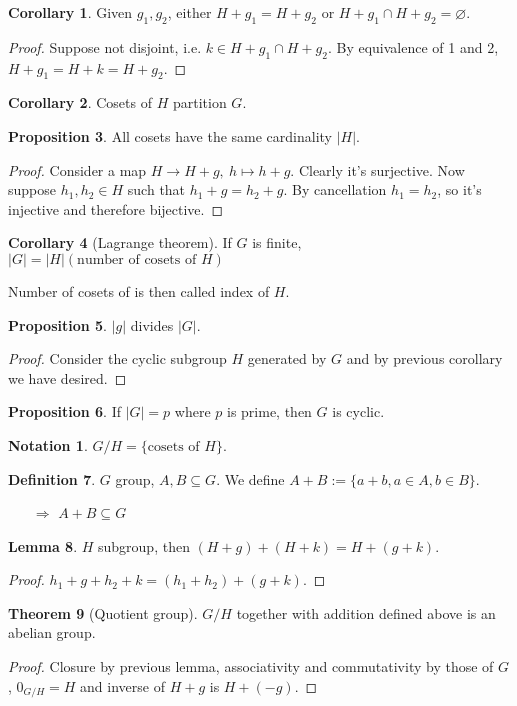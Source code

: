 \documentclass[a4paper]{article}
\theoremstyle{definition}
\newtheorem{defn}{Definition}[subsection]
\newtheorem{prop}[defn]{Proposition}
\newtheorem{thm}[defn]{Theorem}
\newtheorem{lemma}[defn]{Lemma}
\newtheorem{coro}[defn]{Corollary}
\newtheorem*{notation}{Notation}
\begin{document}
\begin{coro}
Given $g_1,g_2$, either $H+g_1=H+g_2$ or $H+g_1\cap H+g_2=\varnothing$.
\end{coro}
\begin{proof}
Suppose not disjoint, i.e. $k\in H+g_1\cap H+g_2$. By equivalence of 1 and 2, $H+g_1=H+k=H+g_2$.
\end{proof}
\begin{coro}
Cosets of $H$ partition $G$.
\end{coro}
\begin{prop}
All cosets have the same cardinality $|H|.$
\end{prop}
\begin{proof}
Consider a map $H\rightarrow H+g,\ h\mapsto h+g$. Clearly it's surjective. Now suppose $h_1,h_2\in H$ such that $h_1+g=h_2+g$. By cancellation $h_1=h_2$, so it's injective and therefore bijective.
\end{proof}
\begin{coro}[Lagrange theorem]
If $G$ is finite, $|G|=|H|(\text{number of cosets of }H)$
\end{coro}
Number of cosets of is then called index of $H.$
\begin{prop}
$|g|$ divides $|G|$.
\end{prop}
\begin{proof}
Consider the cyclic subgroup $H$ generated by $G$ and by previous corollary we have desired.
\end{proof}
\begin{prop}
If $|G|=p$ where $p$ is prime, then $G$ is cyclic.
\end{prop}
\begin{notation}
$G/H=\{\text{cosets of }H\}$.
\end{notation}
\begin{defn}
$G$ group, $A,B \subseteq G$. We define $A+B:=\{a+b,a\in A,b\in B\}$.
\begin{itemize}
    \item[$\Rightarrow$] $A+B \subseteq G$
\end{itemize}
\end{defn}
\begin{lemma}
$H$ subgroup, then $(H+g)+(H+k)=H+(g+k).$
\end{lemma}
\begin{proof}
$h_1+g+h_2+k = (h_1+h_2)+(g+k)$.
\end{proof}

\begin{thm}[Quotient group]
$G/H$ together with addition defined above is an abelian group.
\end{thm}
\begin{proof}
Closure by previous lemma, associativity and commutativity by those of $G$, $0_{G/H}=H$ and inverse of $H+g$ is $H+(-g).$
\end{proof}
\end{document}
